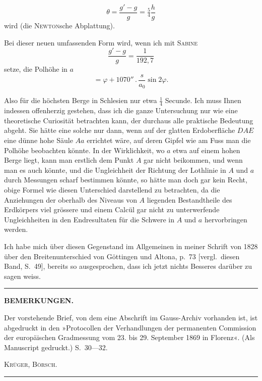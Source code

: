 \begingroup
\setlength{\abovedisplayskip}{6pt}
\setlength{\belowdisplayskip}{6pt}
\setlength{\abovedisplayshortskip}{3pt}
\setlength{\belowdisplayshortskip}{4pt}

\par\clearpage
\noindent{}\makebox[12mm][r]{}\par\medskip

\[
\theta=\frac{g'-g}{g}=\tfrac54\frac hg
\]
\noindent wird (die \textsc{Newton}sche Abplattung).

Bei dieser neuen umfassenden Form wird, wenn ich mit \textsc{Sabine}
\[
\frac{g'-g}{g}=\frac1{192{,}7}
\]
\noindent setze, die Polhöhe in \(a\)
\[
=\varphi+1070''\,.\,\frac{s}{a_0}\sin 2\varphi.
\]

Also für die höchsten Berge in Schlesien nur etwa \(\tfrac14\) Secunde. Ich muss
Ihnen indessen offenherzig gestehen, dass ich die ganze Untersuchung nur wie
eine theoretische Curiosität betrachten kann, der durchaus alle praktische Bedeutung
abgeht. Sie hätte eine solche nur dann, wenn auf der glatten Erdoberfläche
\(DAE\) eine dünne hohe Säule \(Aa\) errichtet wäre, auf deren Gipfel
wie am Fuss man die Polhöhe beobachten könnte. In der Wirklichkeit, wo
\(a\) etwa auf einem hohen Berge liegt, kann man erstlich dem Punkt \(A\) gar
nicht beikommen, und wenn man es auch könnte, und die Ungleichheit der
Richtung der Lothlinie in \(A\) und \(a\) durch Messungen scharf bestimmen
könnte, so hätte man doch gar kein Recht, obige Formel wie diesen Unterschied
darstellend zu betrachten, da die Anziehungen der oberhalb des
Niveaus von \(A\) liegenden Bestandtheile des Erdkörpers viel grössere und
einem Calcül gar nicht zu unterwerfende Ungleichheiten in den Endresultaten
für die Schwere in \(A\) und \(a\) hervorbringen werden.

Ich habe mich über diesen Gegenstand im Allgemeinen in meiner Schrift
von 1828 über den Breitenunterschied von Göttingen und Altona, p.~73 [vergl.\
diesen Band, S.~49], bereits so ausgesprochen, dass ich jetzt nichts Besseres
darüber zu sagen weiss.

\begin{center}\rule{.18\textwidth}{.4pt}\end{center}
{\small
\begin{center}\textbf{BEMERKUNGEN.}\end{center}
Der vorstehende Brief, von dem eine Abschrift im Gauss-Archiv vorhanden ist, ist abgedruckt in den
»Protocollen der Verhandlungen der permanenten Commission der europäischen Gradmessung vom 23. bis
29. September 1869 in Florenz«. (Als Manuscript gedruckt.) S.~30---32.
\par\hfill\textsc{Krüger, Börsch.}\hspace{.06\textwidth}\par
}
\begin{center}\rule{.24\textwidth}{.4pt}\end{center}

